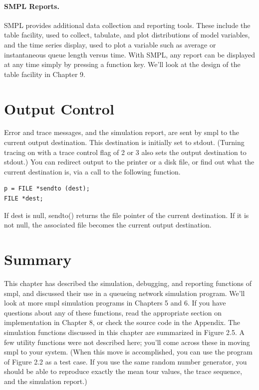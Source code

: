 \paragraph{SMPL Reports.}
SMPL provides additional data collection and reporting tools. These include
the table facility, used to collect, tabulate, and plot distributions of model
variables, and the time series display, used to plot a variable such as average
or instantaneous queue length versus time. With SMPL, any report can be
displayed at any time simply by pressing a function key. We'll look at the
design of the table facility in Chapter 9.

\section{Output Control}
\label{sec:smpl-output-control}

Error and trace messages, and the simulation report, are sent by smpl to the
current output destination. This destination is initially set to stdout.
(Turning tracing on with a trace control flag of 2 or 3 also sets the output
destination to stdout.) You can redirect output to the printer or a disk file,
or find out what the current destination is, via a call to the following
function.

\begin{verbatim}
p = FILE *sendto (dest);
FILE *dest;
\end{verbatim}

If dest is null, sendto() returns the file pointer of the current destination.
If it is not null, the associated file becomes the current output destination.

\section{Summary}
\label{sec:smpl-summary}

This chapter has described the simulation, debugging, and reporting functions
of smpl, and discussed their use in a queueing network simulation program.
We'll look at more smpl simulation programs in Chapters 5 and 6. If you have
questions about any of these functions, read the appropriate section on
implementation in Chapter 8, or check the source code in the Appendix. The
simulation functions discussed in this chapter are summarized in Figure 2.5. A
few utility functions were not described here; you'll come across these in
moving smpl to your system. (When this move is accomplished, you can use the
program of Figure 2.2 as a test case. If you use the same random number
generator, you should be able to reproduce exactly the mean tour values, the
trace sequence, and the simulation report.)

